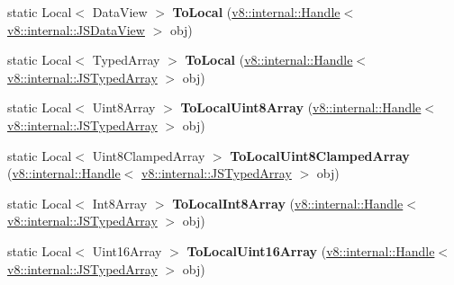 \begin{DoxyCompactItemize}
\item 
\hypertarget{classv8_1_1_utils_a5a80d6ff948e3e66ae0338b27285d943}{}static Local$<$ Data\+View $>$ {\bfseries To\+Local} (\hyperlink{classv8_1_1internal_1_1_handle}{v8\+::internal\+::\+Handle}$<$ \hyperlink{classv8_1_1internal_1_1_j_s_data_view}{v8\+::internal\+::\+J\+S\+Data\+View} $>$ obj)\label{classv8_1_1_utils_a5a80d6ff948e3e66ae0338b27285d943}

\item 
\hypertarget{classv8_1_1_utils_a501a607d456e364d40083fc8a8874c78}{}static Local$<$ Typed\+Array $>$ {\bfseries To\+Local} (\hyperlink{classv8_1_1internal_1_1_handle}{v8\+::internal\+::\+Handle}$<$ \hyperlink{classv8_1_1internal_1_1_j_s_typed_array}{v8\+::internal\+::\+J\+S\+Typed\+Array} $>$ obj)\label{classv8_1_1_utils_a501a607d456e364d40083fc8a8874c78}

\item 
\hypertarget{classv8_1_1_utils_ae22804d5beaa2c8fe0761d137963f553}{}static Local$<$ Uint8\+Array $>$ {\bfseries To\+Local\+Uint8\+Array} (\hyperlink{classv8_1_1internal_1_1_handle}{v8\+::internal\+::\+Handle}$<$ \hyperlink{classv8_1_1internal_1_1_j_s_typed_array}{v8\+::internal\+::\+J\+S\+Typed\+Array} $>$ obj)\label{classv8_1_1_utils_ae22804d5beaa2c8fe0761d137963f553}

\item 
\hypertarget{classv8_1_1_utils_a5e7913057929857dea7a19f79f3ab36f}{}static Local$<$ Uint8\+Clamped\+Array $>$ {\bfseries To\+Local\+Uint8\+Clamped\+Array} (\hyperlink{classv8_1_1internal_1_1_handle}{v8\+::internal\+::\+Handle}$<$ \hyperlink{classv8_1_1internal_1_1_j_s_typed_array}{v8\+::internal\+::\+J\+S\+Typed\+Array} $>$ obj)\label{classv8_1_1_utils_a5e7913057929857dea7a19f79f3ab36f}

\item 
\hypertarget{classv8_1_1_utils_abfaa1700e2a92b3c9c176b730f96aa4c}{}static Local$<$ Int8\+Array $>$ {\bfseries To\+Local\+Int8\+Array} (\hyperlink{classv8_1_1internal_1_1_handle}{v8\+::internal\+::\+Handle}$<$ \hyperlink{classv8_1_1internal_1_1_j_s_typed_array}{v8\+::internal\+::\+J\+S\+Typed\+Array} $>$ obj)\label{classv8_1_1_utils_abfaa1700e2a92b3c9c176b730f96aa4c}

\item 
\hypertarget{classv8_1_1_utils_a2a3de4421377bd956ff04955b2d41f6d}{}static Local$<$ Uint16\+Array $>$ {\bfseries To\+Local\+Uint16\+Array} (\hyperlink{classv8_1_1internal_1_1_handle}{v8\+::internal\+::\+Handle}$<$ \hyperlink{classv8_1_1internal_1_1_j_s_typed_array}{v8\+::internal\+::\+J\+S\+Typed\+Array} $>$ obj)\label{classv8_1_1_utils_a2a3de4421377bd956ff04955b2d41f6d}


\end{DoxyCompactItemize}
